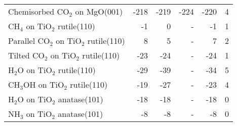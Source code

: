 \begin{table}[h]
\begin{adjustbox}{center,max width=1\textwidth}
\begin{tabular}{lrrrrr}
Chemisorbed CO$_2$ on MgO(001) & -218 & -219 & -224 & -220 & 4 \\
CH$_4$ on TiO$_2$ rutile(110) & -1 & 0 & - & -1 & 1 \\
Parallel CO$_2$ on TiO$_2$ rutile(110) & 8 & 5 & - & 7 & 2 \\
Tilted CO$_2$ on TiO$_2$ rutile(110) & -23 & -24 & - & -24 & 1 \\
H$_2$O on TiO$_2$ rutile(110) & -29 & -39 & - & -34 & 5 \\
CH$_3$OH on TiO$_2$ rutile(110) & -19 & -27 & - & -23 & 4 \\
H$_2$O on TiO$_2$ anatase(101) & -18 & -18 & - & -18 & 0 \\
NH$_3$ on TiO$_2$ anatase(101) & -8 & -8 & - & -8 & 0 \\
\bottomrule
\end{tabular}
\end{adjustbox}
\end{table}